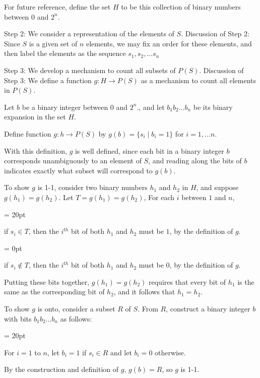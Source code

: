 For future reference, define the set $H$ to be this collection of binary numbers between $0$ and $2^n$.


{\ital Step 2:} We consider a representation of the elements of $S$.
\hfil\break
{\ital Discussion of Step 2:}
Since $S$ is a given set of $n$ elements, we may fix an order for these elements, and then label the elements as the sequence $s_1, s_2, \dots s_n$ 

{\ital Step 3:} We develop a mechanism to count all subsets of $P(S)$.\hfil\break
{\ital Discussion of Step 3:}
We define a function $g: H \to P(S)$ as a mechanism to count all elements in $P(S)$.

Let $b$ be a binary integer between $0$ and $2^n$., and let $b_1 b_2 \dots b_n$ be its binary expansion in the set $H$.  

Define function $g: h \to P(S)$ by $g(b) = \{s_i \mid b_i = 1\}$ for $i=1, \dots n$.

With this definition, $g$ is well defined, since each bit in a binary integer $b$ corresponds unambiguously to an element of $S$, and reading along the bits of $b$ indicates exactly what subset will correspond to $g(b)$.

To show $g$ is 1-1, consider two binary numbers $h_1$ and $h_2$ in $H$, and suppose $g(h_1) = g(h_2)$.  Let $T = g(h_1) = g(h_2)$,
For each $i$ between $1$ and $n$, 

{\parindent = 20pt
\item {} if $s_i \in T$, then the $i^{th}$ bit of both $h_1$ and $h_2$ must be $1$, by the definition of $g$.

\parskip = 0pt
\item {} if $s_i \not\in T$, then the $i^{th}$ bit of both $h_1$ and $h_2$ must be $0$, by the definition of $g$.

}

Putting these bits together, $g(h_1) = g(h_2)$ requires that every bit of $h_1$ is the same as the corresponding bit of $h_2$, and it follows that $h_1=h_2$.

To show $g$  is onto, consider a subset $R$ of $S$.  From $R$, construct a binary integer $b$ with bits $b_1 b_2 \dots b_n$ as follows:

{\parindent = 20pt

\item {}  For $i = 1$ to $n$, let $b_i = 1$ if $s_i \in R$ and let $b_i = 0$ otherwise.

}

By the construction and definition of $g$, $g(b) = R$, so $g$ is 1-1.

